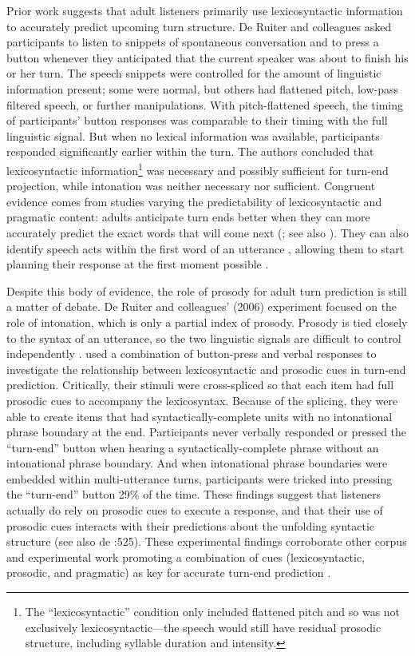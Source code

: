 \documentclass[authoryear, 12pt]{elsarticle}
\begin{document}
Prior work suggests that adult listeners primarily use lexicosyntactic information to accurately predict upcoming turn structure. De Ruiter and colleagues \citeyearpar{de-ruiter2006} asked participants to listen to snippets of spontaneous conversation and to press a button whenever they anticipated that the current speaker was about to finish his or her turn. The speech snippets were controlled for the amount of linguistic information present; some were normal, but others had flattened pitch, low-pass filtered speech, or further manipulations. With pitch-flattened speech, the timing of participants' button responses was comparable to their timing with the full linguistic signal. But when no lexical information was available, participants responded significantly earlier within the turn. The authors concluded that lexicosyntactic information\footnote{The ``lexicosyntactic'' condition only included flattened pitch and so was not exclusively lexicosyntactic---the speech would still have residual prosodic structure, including syllable duration and intensity.} was necessary and possibly sufficient for turn-end projection, while intonation was neither necessary nor sufficient. Congruent evidence comes from studies varying the predictability of lexicosyntactic and pragmatic content: adults anticipate turn ends better when they can more accurately predict the exact words that will come next (\citealp{magyari2012}; see also \citealp{magyari2014}). They can also identify speech acts within the first word of an utterance \citep{gisladottir2015}, allowing them to start planning their response at the first moment possible \citep{bogels2015}.

Despite this body of evidence, the role of prosody for adult turn prediction is still a matter of debate. De Ruiter and colleagues' (2006) experiment focused on the role of intonation, which is only a partial index of prosody. Prosody is tied closely to the syntax of an utterance, so the two linguistic signals are difficult to control independently \citep{ford1996}. \citet*{bogelstorreira2015} used a combination of button-press and verbal responses to investigate the relationship between lexicosyntactic and prosodic cues in turn-end prediction. Critically, their stimuli were cross-spliced so that each item had full prosodic cues to accompany the lexicosyntax. Because of the splicing, they were able to create items that had syntactically-complete units with no intonational phrase boundary at the end. Participants never verbally responded or pressed the ``turn-end'' button when hearing a syntactically-complete phrase without an intonational phrase boundary. And when intonational phrase boundaries were embedded within multi-utterance turns, participants were tricked into pressing the ``turn-end'' button 29\% of the time. These findings suggest that listeners actually do rely on prosodic cues to execute a response, and that their use of prosodic cues interacts with their predictions about the unfolding syntactic structure (see also de \citet{de-ruiter2006}:525). These experimental findings corroborate other corpus and experimental work promoting a combination of cues (lexicosyntactic, prosodic, and pragmatic) as key for accurate turn-end prediction \citep{duncan1972, ford1996, hirvenkari2013}.
\end{document}

